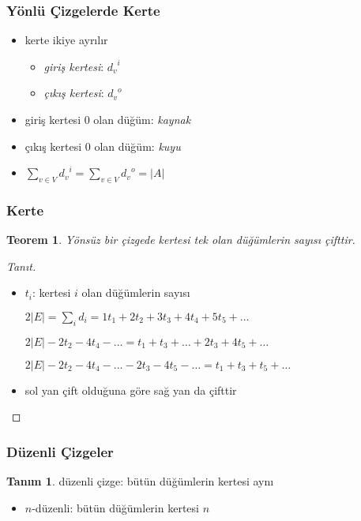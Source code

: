 \documentclass[dvipsnames]{beamer}
\theoremstyle{definition}
\newtheorem{tanim}[theorem]{Tanım}
\theoremstyle{example}
\theoremstyle{plain}
\newtheorem{teorem}[theorem]{Teorem}
\begin{document}
\begin{frame}
  \frametitle{Yönlü Çizgelerde Kerte}

  \begin{itemize}
    \item kerte ikiye ayrılır
    \begin{itemize}
      \item \emph{giriş kertesi}: ${d_v}^i$
      \item \emph{çıkış kertesi}: ${d_v}^o$
    \end{itemize}

    \pause
    \medskip
    \item giriş kertesi 0 olan düğüm: \emph{kaynak}
    \item çıkış kertesi 0 olan düğüm: \emph{kuyu}

    \pause
    \bigskip
    \item $\sum_{v \in V} {d_v}^i = \sum_{v \in V} {d_v}^o = |A|$
  \end{itemize}
\end{frame}

\begin{frame}
  \frametitle{Kerte}

  \begin{teorem}
    Yönsüz bir çizgede kertesi tek olan düğümlerin sayısı çifttir.
  \end{teorem}

  \pause
  \begin{proof}[Tanıt]
    \begin{itemize}
      \item $t_i$: kertesi $i$ olan düğümlerin sayısı

      \pause
$2|E| = \sum_i d_i = 1t_1 + 2t_2 + 3t_3 + 4t_4 + 5t_5 + \dots$

\pause
$2|E| - 2t_2 - 4t_4 - \dots = t_1 + t_3 + \dots + 2t_3 + 4t_5 + \dots$

\pause
$2|E| - 2t_2 - 4t_4 - \dots - 2t_3 - 4t_5 - \dots = t_1 + t_3 + t_5 + \dots$

      \pause
      \item sol yan çift olduğuna göre sağ yan da çifttir
    \end{itemize}
  \end{proof}
\end{frame}

\begin{frame}
  \frametitle{Düzenli Çizgeler}

  \begin{tanim}
    \alert{düzenli} çizge: bütün düğümlerin kertesi aynı

    \begin{itemize}
      \item $n$-düzenli: bütün düğümlerin kertesi $n$
    \end{itemize}
  \end{tanim}
\end{frame}
\end{document}
